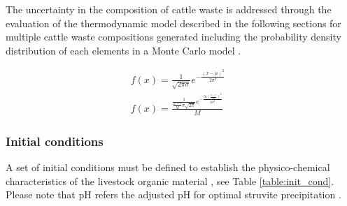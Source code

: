 \begin{refsection}[referencesCh3]
The uncertainty in the composition of cattle waste is addressed through the evaluation of the thermodynamic model described in the following sections for multiple cattle waste compositions generated including the probability density distribution of each elements in a Monte Carlo model \citep{Thomopoulos}.

\begin{align}
f(x) = \frac{1}{\sqrt{2 \pi \sigma}}e^{- \frac{\left( x - \mu \right)^{2}}{2 \sigma ^ {2}}} & \label{eq:normal_dist} \\
f(x) = \frac{\frac{1}{\frac{x- \gamma}{M} \sigma \sqrt{2 \pi}} e^{-\frac{ln\left( \frac{x- \gamma}{M} \right)^{2}}{2 \sigma^{2}}}}{M} \label{eq:lognormal_dist}
\end{align}

\begin{table}[h] 
	\centering
	\caption{Probability density distributions parameters for cattle organic waste elements.} \label{table:PDD_paramenters}
\end{table}

\subsubsection{Initial conditions} \label{Initial parameters}
A set of initial conditions must be defined to establish the physico-chemical characteristics of the livestock organic material \citep{Tao}, see Table \ref{table:init_cond}. Please note that pH refers the adjusted pH for optimal struvite precipitation \citep{Tao, Zeng}. 


\end{refsection}
